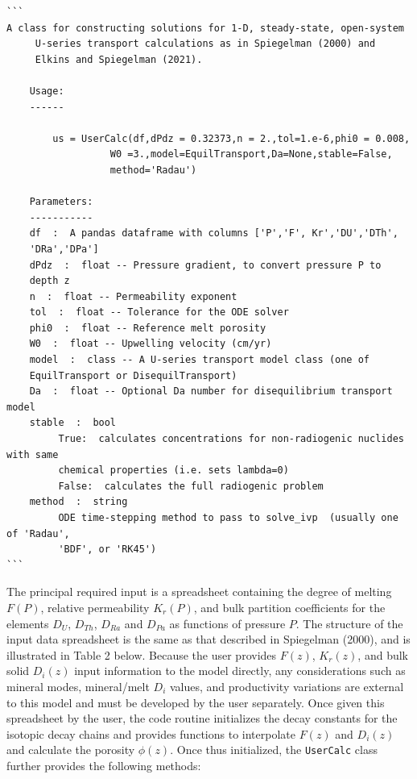 \documentclass[draft]{agujournal2019}
\begin{document}
\sffamily
\color{purple}
\begin{verbatim}
```
A class for constructing solutions for 1-D, steady-state, open-system
     U-series transport calculations as in Spiegelman (2000) and 
     Elkins and Spiegelman (2021).

    Usage:
    ------
     
        us = UserCalc(df,dPdz = 0.32373,n = 2.,tol=1.e-6,phi0 = 0.008,
                  W0 =3.,model=EquilTransport,Da=None,stable=False,
                  method='Radau')

    Parameters:
    -----------
    df  :  A pandas dataframe with columns ['P','F', Kr','DU','DTh',
    'DRa','DPa']
    dPdz  :  float -- Pressure gradient, to convert pressure P to 
    depth z
    n  :  float -- Permeability exponent
    tol  :  float -- Tolerance for the ODE solver
    phi0  :  float -- Reference melt porosity
    W0  :  float -- Upwelling velocity (cm/yr)
    model  :  class -- A U-series transport model class (one of 
    EquilTransport or DisequilTransport)
    Da  :  float -- Optional Da number for disequilibrium transport model
    stable  :  bool
         True:  calculates concentrations for non-radiogenic nuclides with same 
         chemical properties (i.e. sets lambda=0)
         False:  calculates the full radiogenic problem
    method  :  string
         ODE time-stepping method to pass to solve_ivp  (usually one of 'Radau', 
         'BDF', or 'RK45')
```
\end{verbatim}

\color{black}
\normalfont
The principal required input is a spreadsheet containing the degree of melting $F(P)$, relative permeability $K_r(P)$, and bulk partition coefficients for the elements $D_U$, $D_{Th}$, $D_{Ra}$ and $D_{Pa}$ as functions of pressure $P$. The structure of the input data spreadsheet is the same as that described in Spiegelman (2000), and is illustrated in Table 2 below. Because the user provides $F(z)$, $K_r(z)$, and bulk solid $D_i(z)$ input information to the model directly, any considerations such as mineral modes, mineral/melt $D_i$ values, and productivity variations are external to this model and must be developed by the user separately. Once given this spreadsheet by the user, the code routine initializes the decay constants for the isotopic decay chains and provides functions to interpolate $F(z)$ and $D_i(z)$ and calculate the porosity $\phi(z)$. Once thus initialized, the \colorbox{gray!20}{\texttt{UserCalc}} class further provides the following methods:
\end{document}
